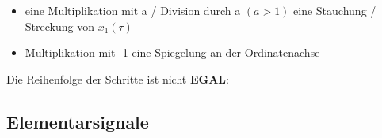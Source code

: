 \begin{enumerate}
\begin{mdframed}[style=exercise]
\begin{itemize}
              \item{eine Multiplikation mit a / Division durch a $(a>1)$ eine Stauchung /
                  Streckung von $x_1(\tau)$}

              \item{Multiplikation mit -1 eine Spiegelung an der Ordinatenachse}
          \end{itemize}
          Die Reihenfolge der Schritte ist nicht \textbf{EGAL}:\\
          \color{red}{erst Verschieben um $b$, dann Skalieren/Invertieren mit $-a$}
          \end{mdframed}
  \end{enumerate}
  \subsection{Elementarsignale}
